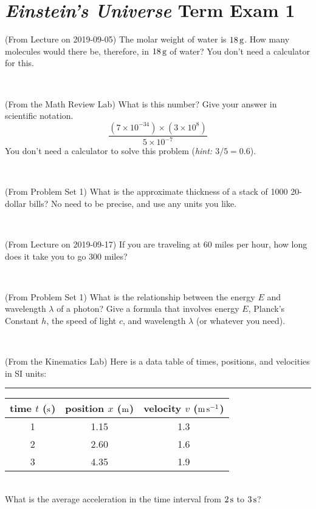 \documentclass[12pt, letterpaper]{article}
\begin{document}
\section*{\textsl{Einstein's Universe} Term Exam 1}
\setcounter{problem}{1}


\begin{problem} (From Lecture on 2019-09-05)
The molar weight of water is $18\,\mathrm{g}$. How many molecules would there
be, therefore, in $18\,\mathrm{g}$ of water? You don't need a calculator for
this.
\end{problem}


\vfill ~

\begin{problem} (From the Math Review Lab)
What is this number? Give your answer in scientific notation.
$$
\frac{(7\times10^{-34})\times(3\times10^8)}{5\times10^{-7}}
$$
You don't need a calculator to solve this problem (\textit{hint: $3/5=0.6$}).
\end{problem}


\vfill ~

\begin{problem} (From Problem Set 1)
What is the approximate thickness of a stack of 1000 20-dollar bills?
No need to be precise, and use any units you like.
\end{problem}


\vfill ~

\begin{problem} (From Lecture on 2019-09-17)
If you are traveling at 60 miles per hour, how long does
it take you to go 300 miles?
\end{problem}


\vfill ~


\clearpage


\begin{problem} (From Problem Set 1)
What is the relationship between the energy $E$ and wavelength
$\lambda$ of a photon? Give a formula that involves energy $E$,
Planck's Constant $h$, the speed of light $c$, and wavelength
$\lambda$ (or whatever you need).
\end{problem}

\vfill ~

\begin{problem} (From the Kinematics Lab)
Here is a data table of times, positions, and velocities in SI units:\\
\rule{1.0in}{0pt}\begin{tabular}{c|c|c}
time $t$ ($\mathrm{s}$) & position $x$ ($\mathrm{m}$) & velocity $v$ ($\mathrm{m}\,\mathrm{s}^{-1}$) \\
\hline
1 & 1.15 & 1.3 \\
2 & 2.60 & 1.6 \\
3 & 4.35 & 1.9 \\
\hline
\end{tabular}\\
What is the average acceleration in the time interval from $2\,\mathrm{s}$ to $3\,\mathrm{s}$?
\end{problem}
\end{document}
